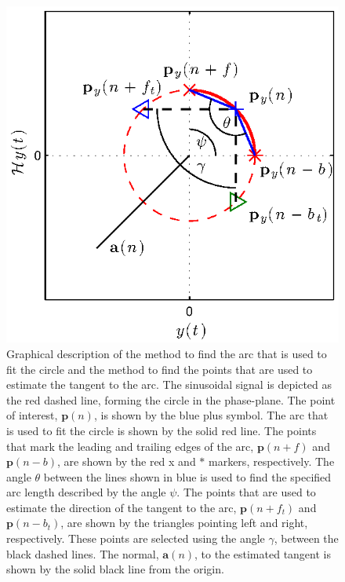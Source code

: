 \documentclass[11pt,draftcls,onecolumn]{IEEEtran}
\begin{document}
\begin{figure}[ht]
	\centering
		\includegraphics[scale=1]{./Figures/eps/SetArcLengthDemo.eps}
	\caption{Graphical description of the method to find the arc that is used to fit the circle and the method to find the points that are used to estimate the tangent to the arc. The sinusoidal signal is depicted as the red dashed line, forming the circle in the phase-plane. The point of interest, $\mathbf{p}(n)$, is shown by the blue plus symbol. The arc that is used to fit the circle is shown by the solid red line. The points that mark the leading and trailing edges of the arc, $\mathbf{p}(n+f)$ and $\mathbf{p}(n-b)$, are shown by the red x and $\ast$ markers, respectively. The angle $\theta$ between the lines shown in blue is used to find the specified arc length described by the angle $\psi$. The points that are used to estimate the direction of the tangent to the arc, $\mathbf{p}(n+f_t)$ and $\mathbf{p}(n-b_t)$, are shown by the triangles pointing left and right, respectively. These points are selected using the angle $\gamma$, between the black dashed lines. The normal, $\mathbf{a}(n)$, to the estimated tangent is shown by the solid black line from the origin.}
	\label{fig:SetArcLengthDemo}
\end{figure}
\end{document}
